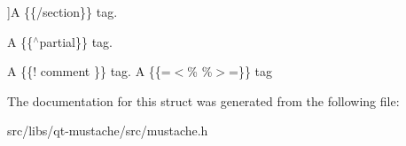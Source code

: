 \begin{Desc}
\begin{description}
{}]A \{\{/section\}\} tag. \item[{\em 
\hypertarget{structMustache_1_1Tag_ab702ed1288811f8bb16d76babfdb6472a85c0e87f362943cf0244792873edd478}{Comment}\label{structMustache_1_1Tag_ab702ed1288811f8bb16d76babfdb6472a85c0e87f362943cf0244792873edd478}
}]A \{\{$^\wedge$partial\}\} tag. \item[{\em 
\hypertarget{structMustache_1_1Tag_ab702ed1288811f8bb16d76babfdb6472a680bf1878bdfa8c7ed5a594603b638be}{Set\+Delimiter}\label{structMustache_1_1Tag_ab702ed1288811f8bb16d76babfdb6472a680bf1878bdfa8c7ed5a594603b638be}
}]A \{\{! comment \}\} tag. A \{\{=$<$\% \%$>$=\}\} tag \end{description}
\end{Desc}


The documentation for this struct was generated from the following file\+:\begin{DoxyCompactItemize}
\item 
src/libs/qt-\/mustache/src/mustache.\+h\end{DoxyCompactItemize}
